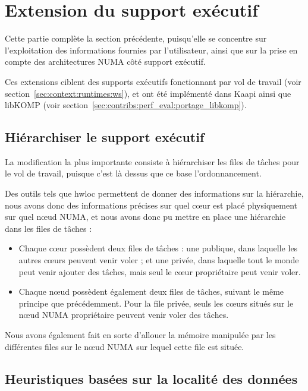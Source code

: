 \section{Extension du support exécutif}\label{sec:openmp:runtime}

Cette partie complète la section précédente, puisqu'elle se concentre sur l'exploitation des informations fournies par l'utilisateur, ainsi que sur la prise en compte des architectures NUMA côté support exécutif.

Ces extensions ciblent des supports exécutifs fonctionnant par vol de travail (voir section~\ref{sec:context:runtimes:ws}), et ont été implémenté dans Kaapi ainsi que libKOMP (voir section~\ref{sec:contribs:perf_eval:portage_libkomp}).

\subsection{Hiérarchiser le support exécutif}

La modification la plus importante consiste à hiérarchiser les files de tâches pour le vol de travail, puisque c'est là dessus que ce base l'ordonnancement.

Des outils tels que hwloc permettent de donner des informations sur la hiérarchie, nous avons donc des informations précises sur quel cœur est placé physiquement sur quel nœud NUMA, et nous avons donc pu mettre en place une hiérarchie dans les files de tâches :

\begin{itemize}
  \item Chaque cœur possèdent deux files de tâches : une publique, dans laquelle les autres cœurs peuvent venir voler ; et une privée, dans laquelle tout le monde peut venir ajouter des tâches, mais seul le cœur propriétaire peut venir voler.
  \item Chaque nœud possèdent également deux files de tâches, suivant le même principe que précédemment. Pour la file privée, seuls les cœurs situés sur le nœud NUMA propriétaire peuvent venir voler des tâches.
\end{itemize}

Nous avons également fait en sorte d'allouer la mémoire manipulée par les différentes files sur le nœud NUMA sur lequel cette file est située.



\subsection{Heuristiques basées sur la localité des données}\label{sec:contrib:ws:heuristics}

